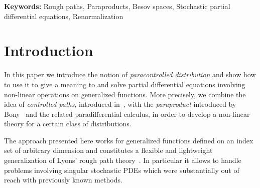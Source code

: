 \documentclass[11pt,a4paper]{article}
\newcommand{\tmsep}{, }
\newcommand{\tmkeywords}{\textbf{Keywords:} }
\theoremstyle{remark}
\begin{document}
\tmkeywords{Rough paths}{\tmsep}{Paraproducts}{\tmsep}{Besov spaces}{\tmsep}{Stochastic partial differential equations}{\tmsep}{Renormalization}

\tableofcontents

\section{Introduction}

In this paper we introduce the notion of \emph{paracontrolled distribution} and show how to use it to give a meaning to and solve partial differential equations involving non-linear operations on generalized functions.  More precisely, we combine the idea of \emph{controlled paths}, introduced  in~\cite{Gubinelli2004}, with the \emph{paraproduct} introduced by Bony~\cite{Bony1981} and the related paradifferential calculus, in order to develop a non-linear theory for a certain class of distributions.

The approach presented here works for generalized functions defined on an index set of arbitrary dimension and constitutes a flexible and lightweight generalization of Lyons' rough path theory~\cite{Lyons1998}. In particular it allows to handle problems involving singular stochastic PDEs which were substantially out of reach with previously known methods.
\end{document}
